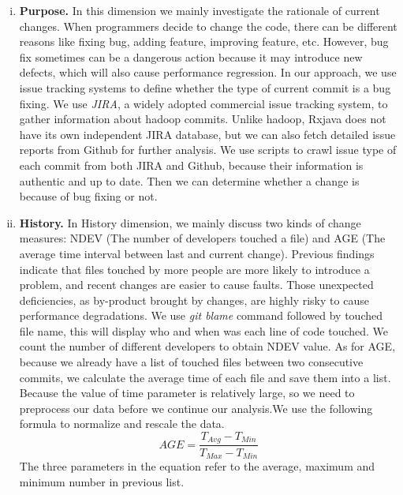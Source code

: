 \begin{enumerate}[(i)]
	\item \noindent
	\textbf{Purpose.}
	In this dimension we mainly investigate the rationale of current changes. When programmers decide to change the code, there can be different reasons like fixing bug, adding feature, improving feature, etc.
	However, bug fix sometimes can be a dangerous action because it may introduce new defects, which will also cause performance regression. In our approach, we use issue tracking systems to define whether the type of current commit is a bug fixing. We use \textit{JIRA}, a widely adopted commercial issue tracking system, to gather information about hadoop commits. Unlike hadoop, Rxjava does not have its own independent JIRA database, but we can also fetch detailed issue reports from Github for further analysis. We use scripts to crawl issue type of each commit from both JIRA and Github, because their information is authentic and up to date. Then we can determine whether a change is because of bug fixing or not.
	
	\item \noindent
	\textbf{History.}
	In History dimension, we mainly discuss two kinds of change measures: NDEV (The number of developers touched a file) and AGE (The average time interval between last and current change). Previous findings indicate that files touched by more people are more likely to introduce a problem\cite{matsumoto2010analysis}, and recent changes are easier to cause faults\cite{eick2001does}. Those unexpected deficiencies, as by-product brought by changes, are highly risky to cause performance degradations. We use \textit{git blame} command followed by touched file name, this will display who and when was each line of code touched. We count the number of different developers to obtain NDEV value. As for AGE, because we already have a list of touched files between two consecutive commits, we calculate the average time of each file and save them into a list. Because the value of time parameter is relatively large, so we need to preprocess our data before we continue our analysis.We use the following formula to normalize and rescale the data.
	\begin{equation}
	AGE = \frac{T_{Avg}-T_{Min}}{T_{Max}-T_{Min}}
	\end{equation}
	The three parameters in the equation refer to the average, maximum and minimum number in previous list. 
	

\end{enumerate}
